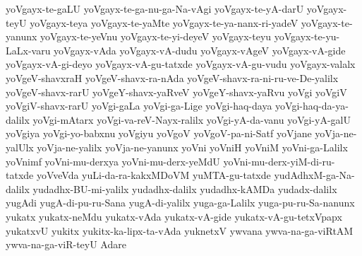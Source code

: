 {yoVgayx-te-gaLU
yoVgayx-te-ga-nu-ga-Na-vAgi
yoVgayx-te-yA-darU
yoVgayx-teyU
yoVgayx-teya
yoVgayx-te-yaMte
yoVgayx-te-ya-nanx-ri-yadeV
yoVgayx-te-yanunx
yoVgayx-te-yeVnu
yoVgayx-te-yi-deyeV
yoVgayx-teyu
yoVgayx-te-yu-LaLx-varu
yoVgayx-vAda
yoVgayx-vA-dudu
yoVgayx-vAgeV
yoVgayx-vA-gide
yoVgayx-vA-gi-deyo
yoVgayx-vA-gu-tatxde
yoVgayx-vA-gu-vudu
yoVgayx-valalx
yoVgeV-shavxraH
yoVgeV-shavx-ra-nAda
yoVgeV-shavx-ra-ni-ru-ve-De-yalilx
yoVgeV-shavx-rarU
yoVgeY-shavx-yaRveV
yoVgeY-shavx-yaRvu
yoVgi
yoVgiV
yoVgiV-shavx-rarU
yoVgi-gaLa
yoVgi-ga-Lige
yoVgi-haq-daya
yoVgi-haq-da-ya-dalilx
yoVgi-mAtarx
yoVgi-va-reV-Nayx-ralilx
yoVgi-yA-da-vanu
yoVgi-yA-galU
yoVgiya
yoVgi-yo-babxnu
yoVgiyu
yoVgoV
yoVgoV-pa-ni-Satf
yoVjane
yoVja-ne-yalUlx
yoVja-ne-yalilx
yoVja-ne-yanunx
yoVni
yoVniH
yoVniM
yoVni-ga-Lalilx
yoVnimf
yoVni-mu-derxya
yoVni-mu-derx-yeMdU
yoVni-mu-derx-yiM-di-ru-tatxde
yoVveVda
yuLi-da-ra-kakxMDoVM
yuMTA-gu-tatxde
yudAdhxM-ga-Na-dalilx
yudadhx-BU-mi-yalilx
yudadhx-dalilx
yudadhx-kAMDa
yudadx-dalilx
yugAdi
yugA-di-pu-ru-Sana
yugA-di-yalilx
yuga-ga-Lalilx
yuga-pu-ru-Sa-nanunx
yukatx
yukatx-neMdu
yukatx-vAda
yukatx-vA-gide
yukatx-vA-gu-tetxVpapx
yukatxvU
yukitx
yukitx-ka-lipx-ta-vAda
yuknetxV
ywvana
ywva-na-ga-viRtAM
ywva-na-ga-viR-teyU
‌Adare
}
